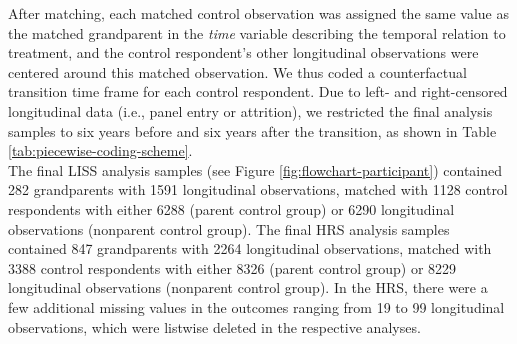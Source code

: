\documentclass[
  english,
  man,floatsintext]{apa7}
\begin{document}
After matching, each matched control observation was assigned the same value as the matched grandparent in the \emph{time} variable describing the temporal relation to treatment, and the control respondent's other longitudinal observations were centered around this matched observation. We thus coded a counterfactual transition time frame for each control respondent. Due to left- and right-censored longitudinal data (i.e., panel entry or attrition), we restricted the final analysis samples to six years before and six years after the transition, as shown in Table \ref{tab:piecewise-coding-scheme}.\\
The final LISS analysis samples (see Figure \ref{fig:flowchart-participant}) contained 282 grandparents with 1591 longitudinal observations, matched with 1128 control respondents with either 6288 (parent control group) or 6290 longitudinal observations (nonparent control group). The final HRS analysis samples contained 847 grandparents with 2264 longitudinal observations, matched with 3388 control respondents with either 8326 (parent control group) or 8229 longitudinal observations (nonparent control group). In the HRS, there were a few additional missing values in the outcomes ranging from 19 to 99 longitudinal observations, which were listwise deleted in the respective analyses.
\end{document}
